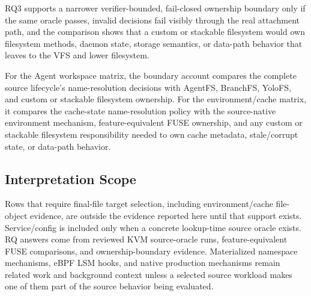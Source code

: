 RQ3 supports a narrower verifier-bounded, fail-closed ownership boundary only
if the same oracle passes, invalid decisions fail visibly through the real
attachment path, and the comparison shows that a custom or stackable filesystem
would own filesystem methods, daemon state, storage semantics, or data-path
behavior that \namei leaves to the VFS and lower filesystem.

For the Agent workspace matrix, the boundary account compares the complete
source lifecycle's name-resolution decisions with AgentFS, BranchFS, YoloFS,
and custom or stackable filesystem ownership. For the environment/cache matrix,
it compares the cache-state name-resolution policy with the source-native
environment mechanism, feature-equivalent FUSE ownership, and any custom or
stackable filesystem responsibility needed to own cache metadata, stale/corrupt
state, or data-path behavior.

\subsection{Interpretation Scope}

Rows that require final-file target selection, including environment/cache
file-object evidence, are outside the evidence reported here until that support
exists. Service/config is included only when a concrete lookup-time source
oracle exists. RQ answers come from reviewed KVM source-oracle runs,
feature-equivalent FUSE comparisons, and ownership-boundary evidence.
Materialized namespace mechanisms, eBPF LSM hooks, and native production
mechanisms remain related work and background context unless a selected source
workload makes one of them part of the source behavior being evaluated.
